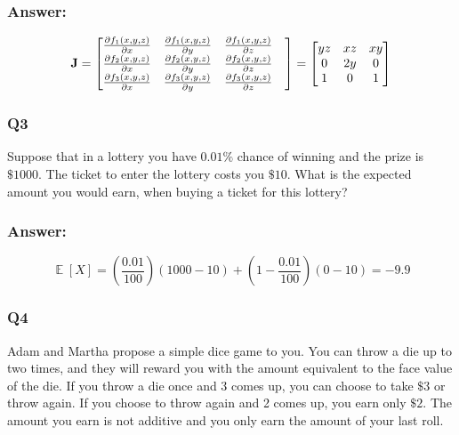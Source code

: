 \documentclass[a4paper, 10pt]{article}
\DeclareMathOperator{\E}{\mathbb{E}}
\begin{document}
\subsubsection*{Answer:}
\begin{equation*}
  {\bf J} =
  \begin{bmatrix}
    \frac{\partial f_1(x,y,z)}{\partial x} &
    \frac{\partial f_1(x,y,z)}{\partial y} &
    \frac{\partial f_1(x,y,z)}{\partial z} & \\
    \frac{\partial f_2(x,y,z)}{\partial x} &
    \frac{\partial f_2(x,y,z)}{\partial y} &
    \frac{\partial f_2(x,y,z)}{\partial z} & \\
    \frac{\partial f_3(x,y,z)}{\partial x} &
    \frac{\partial f_3(x,y,z)}{\partial y} &
    \frac{\partial f_3(x,y,z)}{\partial z}
  \end{bmatrix}
  =
  \begin{bmatrix}
    yz & xz & xy \\ 0 & 2y & 0 \\ 1 & 0 & 1
  \end{bmatrix}
\end{equation*}

\subsubsection*{Q3}
Suppose that in a lottery you have $0.01\%$ chance of winning and the prize is $\$1000$. The ticket to enter the lottery costs you $\$10$. What is the expected amount you would earn, when buying a ticket for this lottery? 

\subsubsection*{Answer:}
\begin{equation*}
  \E[X] = \left(\frac{0.01}{100}\right) (1000 - 10) + \left(1 - \frac{0.01}{100}\right) (0 - 10) = -9.9
\end{equation*}

\subsubsection*{Q4}
Adam and Martha propose a simple dice game to you. You can throw a die up to two times, and they will reward you with the amount equivalent to the face value of the die. If you throw a die once and 3 comes up, you can choose to take $\$3$ or throw again. If you choose to throw again and 2 comes up, you earn only $\$2$. The amount you earn is not additive and you only earn the amount of your last roll. 
\end{document}
